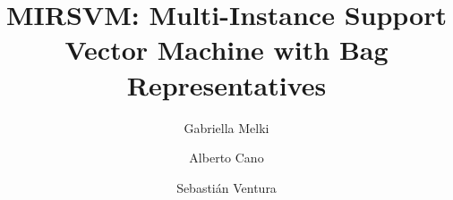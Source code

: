 \RequirePackage{fix-cm}
\documentclass[smallcondensed]{svjour3}                 
\smartqed  
{}
\usepackage[hidelinks]{hyperref}
\usepackage{amsmath,amssymb,mathtools,float,times,bm,tikz,proof,tabularx,capt-of,natbib}
\usepackage{graphicx,amsfonts,array,url,algorithm,algorithmicx,algpseudocode,booktabs}
\usepackage[flushleft]{threeparttable}
\usepackage[top=1in,bottom=1in,right=1in,left=1in]{geometry}
\usepackage{tikz-cd,adjustbox}
\usetikzlibrary{shapes.geometric,arrows,automata,positioning}
\usepackage{setspace}
\let\Algorithm\algorithm
\renewcommand\algorithm[1][]{\Algorithm[#1]\setstretch{1}}

\newcommand{\iitem}{\item[-]}
\newcommand{\set}[1]{{\left\{#1\right\}}} 
\newcommand{\norm}[1]{{||#1||}} 
\newcommand{\st}{{\,|\,}} 
\newcommand{\reals}{{\mathbb R}}
\newcommand{\ints}{{\mathbb Z}}
\newcommand{\spa}[1]{\mathcal{#1}}
\newcommand\tab[1][1cm]{\hspace*{#1}}

\overfullrule=5pt




 = [diamond, draw, text centered, inner sep=3pt]
 = [rectangle, draw, fill=gray!20,text width=5em, text centered, rounded corners, minimum height=4em]
 = [thick,->,>=stealth]

\title{MIRSVM: Multi-Instance Support Vector Machine with Bag Representatives}

\author{Gabriella Melki \and
        Alberto Cano			\and
        Sebasti\'an Ventura
}


